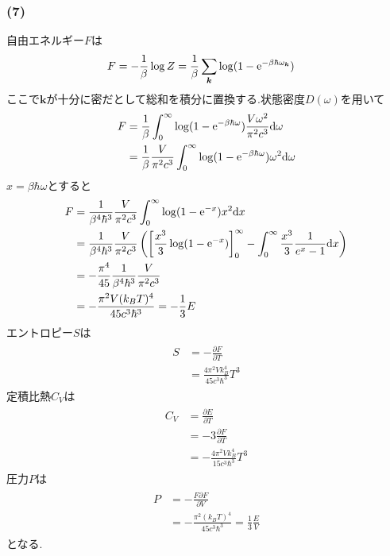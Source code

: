 \documentclass[uplatex,a4j,11pt,dvipdfmx]{jsarticle}
\begin{document}
\subsubsection*{(7)}
自由エネルギー$F$は
\begin{align}
  F&=-\frac{1}{\beta}\log Z=\frac{1}{\beta}\sum_{\bm{k}}\log(1-{\rm e}^{-\beta\hbar\omega_{\bm{k}}})
\end{align}
ここで$\bm{k}$が十分に密だとして総和を積分に置換する.状態密度$D(\omega)$を用いて
\begin{align}
  \begin{split}
    F&=\frac{1}{\beta}\int_0^{\infty}\log(1-{\rm e}^{-\beta\hbar\omega})\frac{V\omega^2}{\pi^2c^3}{\rm d}\omega\\
    &=\frac{1}{\beta}\frac{V}{\pi^2c^3}\int_0^\infty\log(1-{\rm e}^{-\beta\hbar\omega})\omega^2{\rm d}\omega  
  \end{split}
\end{align}
$x=\beta\hbar\omega$とすると
\begin{align}
  \begin{split}
    F&=\frac{1}{\beta^4\hbar^3}\frac{V}{\pi^2c^3}\int_0^\infty\log(1-{\rm e}^{-x})x^2{\rm d}x\\
    &=\frac{1}{\beta^4\hbar^3}\frac{V}{\pi^2c^3}\left( \left[ \frac{x^3}{3}\log(1-{\rm e}^{-x}) \right]_0^\infty -\int_0^\infty\frac{x^3}{3}\frac{1}{e^x-1}{\rm d}x\right)\\
    &=-\frac{\pi^4}{45}\frac{1}{\beta^4\hbar^3}\frac{V}{\pi^2c^3}\\
    &=-\frac{\pi^2V(k_BT)^4}{45c^3\hbar^3}=-\frac{1}{3}E
  \end{split}
\end{align}
エントロピー$S$は
\begin{align}
  \begin{split}
    S&=-\frac{\partial F}{\partial T}\\
    &=\frac{4\pi^2Vk_B^4}{45c^3\hbar^3}T^3
  \end{split}
\end{align}
定積比熱$C_V$は
\begin{align}
  \begin{split}
    C_V&=\frac{\partial E}{\partial T}\\
    &=-3\frac{\partial F}{\partial T}\\
    &=-\frac{4\pi^2Vk_B^4}{15c^3\hbar^3}T^3
  \end{split}
\end{align}
圧力$P$は
\begin{align}
  \begin{split}
    P&=-\frac{F\partial F}{\partial V}\\
    &=-\frac{\pi^2(k_BT)^4}{45c^3\hbar^3}=\frac{1}{3}\frac{E}{V}
  \end{split}
\end{align}
となる.
\end{document}
